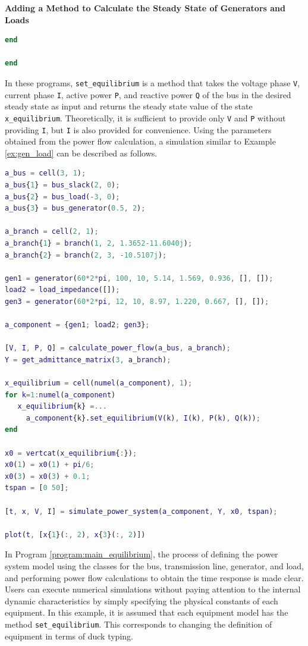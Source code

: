 \documentclass[graybox, envcountchap]{svmult}
\begin{document}
\begin{example}{\textbf{Adding a Method to Calculate the Steady State of Generators and
Loads}}
\begin{lstlisting}[language=Matlab, caption=load\_impedance.m, label={program:load2}]
  end

end
\end{lstlisting}

In these programs, \verb|set_equilibrium| is a method that takes the voltage
phase \verb|V|, current phase \verb|I|, active power \verb|P|, and reactive
power \verb|Q| of the bus in the desired steady state as input and returns the
steady state value of the state \verb|x_equilibrium|. Theoretically, it is
sufficient to provide only \verb|V| and \verb|P| without providing \verb|I|, but
\verb|I| is also provided for convenience. Using the parameters obtained from
the power flow calculation, a simulation similar to Example \ref{ex:gen_load}
can be described as follows.


\begin{lstlisting}[language=Matlab, caption=main\_simulation\_3bus\_equilibrium.m, label={program:main_equilibrium}]
a_bus = cell(3, 1);
a_bus{1} = bus_slack(2, 0);
a_bus{2} = bus_load(-3, 0);
a_bus{3} = bus_generator(0.5, 2);

a_branch = cell(2, 1);
a_branch{1} = branch(1, 2, 1.3652-11.6040j);
a_branch{2} = branch(2, 3, -10.5107j);

gen1 = generator(60*2*pi, 100, 10, 5.14, 1.569, 0.936, [], []);
load2 = load_impedance([]);
gen3 = generator(60*2*pi, 12, 10, 8.97, 1.220, 0.667, [], []);

a_component = {gen1; load2; gen3};

[V, I, P, Q] = calculate_power_flow(a_bus, a_branch);
Y = get_admittance_matrix(3, a_branch);

x_equilibrium = cell(numel(a_component), 1);
for k=1:numel(a_component)
   x_equilibrium{k} =...
     a_component{k}.set_equilibrium(V(k), I(k), P(k), Q(k)); 
end

x0 = vertcat(x_equilibrium{:});
x0(1) = x0(1) + pi/6;
x0(3) = x0(3) + 0.1;
tspan = [0 50];

[t, x, V, I] = simulate_power_system(a_component, Y, x0, tspan);

plot(t, [x{1}(:, 2), x{3}(:, 2)])
\end{lstlisting}

In Program \ref{program:main_equilibrium}, the process of defining the power
system model using the classes for the bus, transmission line, generator, and
load, and performing power flow calculations to obtain the time response is made
clear. Users can execute numerical simulations without paying attention to the
internal dynamic characteristics by simply specifying the physical constants of
each equipment. In this example, it is assumed that each equipment model has the
method \verb|set_equilibrium|. This corresponds to changing the definition of
equipment in terms of duck typing.

\end{example}
\end{document}
